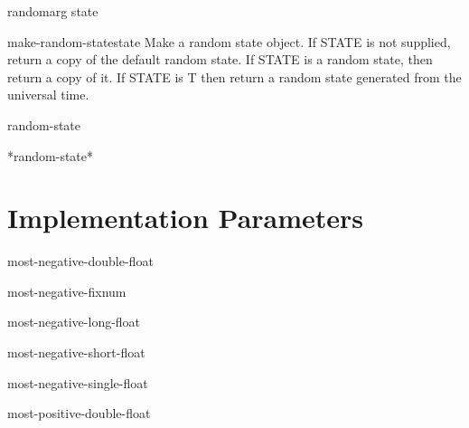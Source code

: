 \begin{function}{random}{arg \op state}{}{}
  
\end{function}

\begin{function}{make-random-state}{\op state}{}{}
  Make a random state object. If STATE is not supplied, return a copy
  of the default random state. If STATE is a random state, then return a
  copy of it. If STATE is T then return a random state generated from
  the universal time.
\end{function}

\begin{class}{random-state}{}{}{}
  
\end{class}

\begin{variable}{*random-state*}{}{}{}
  
\end{variable}

\section{Implementation Parameters}
\label{sec:impl-param}

\begin{constant}{most-negative-double-float}{}{}{}
  
\end{constant}

\begin{constant}{most-negative-fixnum}{}{}{}
  
\end{constant}

\begin{constant}{most-negative-long-float}{}{}{}
  
\end{constant}

\begin{constant}{most-negative-short-float}{}{}{}
  
\end{constant}

\begin{constant}{most-negative-single-float}{}{}{}
  
\end{constant}

\begin{constant}{most-positive-double-float}{}{}{}
  
\end{constant}

